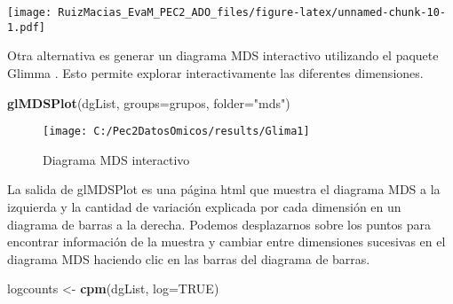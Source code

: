\documentclass[
]{article}
\newenvironment{Shaded}{\begin{snugshade}}{\end{snugshade}}
\newcommand{\DataTypeTok}[1]{\textcolor[rgb]{0.13,0.29,0.53}{#1}}
\newcommand{\DecValTok}[1]{\textcolor[rgb]{0.00,0.00,0.81}{#1}}
\newcommand{\FloatTok}[1]{\textcolor[rgb]{0.00,0.00,0.81}{#1}}
\newcommand{\KeywordTok}[1]{\textcolor[rgb]{0.13,0.29,0.53}{\textbf{#1}}}
\newcommand{\NormalTok}[1]{#1}
\newcommand{\OperatorTok}[1]{\textcolor[rgb]{0.81,0.36,0.00}{\textbf{#1}}}
\newcommand{\OtherTok}[1]{\textcolor[rgb]{0.56,0.35,0.01}{#1}}
\newcommand{\StringTok}[1]{\textcolor[rgb]{0.31,0.60,0.02}{#1}}
\begin{document}
\begin{Shaded}
\end{Shaded}

\texttt{[image: RuizMacias\_EvaM\_PEC2\_ADO\_files/figure-latex/unnamed-chunk-10-1.pdf]}

Otra alternativa es generar un diagrama MDS interactivo utilizando el
paquete Glimma . Esto permite explorar interactivamente las diferentes
dimensiones.

\begin{Shaded}
\begin{Highlighting}[]
\KeywordTok{glMDSPlot}\NormalTok{(dgList, }\DataTypeTok{groups=}\NormalTok{grupos, }\DataTypeTok{folder=}\StringTok{"mds"}\NormalTok{)}
\end{Highlighting}
\end{Shaded}

\begin{figure}
\texttt{[image: C:/Pec2DatosOmicos/results/Glima1]} \caption{Diagrama MDS interactivo}\label{fig:unnamed-chunk-12}
\end{figure}

La salida de glMDSPlot es una página html que muestra el diagrama MDS a
la izquierda y la cantidad de variación explicada por cada dimensión en
un diagrama de barras a la derecha. Podemos desplazarnos sobre los
puntos para encontrar información de la muestra y cambiar entre
dimensiones sucesivas en el diagrama MDS haciendo clic en las barras del
diagrama de barras.

\begin{Shaded}
\begin{Highlighting}[]
\NormalTok{logcounts <-}\StringTok{ }\KeywordTok{cpm}\NormalTok{(dgList, }\DataTypeTok{log=}\OtherTok{TRUE}\NormalTok{)}
\end{Highlighting}
\end{Shaded}
\end{document}
